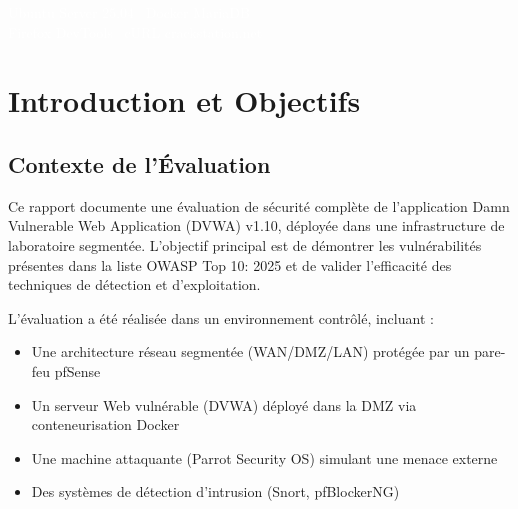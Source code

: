 \documentclass[12pt,a4paper,openany]{report}
\newif\ifshowpagenumbers
\newcommand{\hidepagenumbers}{\showpagenumbersfalse\pagestyle{empty}}
\newcommand{\showpagenumbers}{\showpagenumberstrue\pagestyle{fancy}}
\begin{document}
\begin{titlepage}
		\vfill
		
		\noindent
		\colorbox{primary}{%
			\parbox{\dimexpr\textwidth-2\fboxsep}{%
				\vspace{0.35cm}
				\centering
				{\small\textcolor{white}{%
						Ubuntu Server 25.04 \textbullet\ Docker
						\quad\textbullet\quad MariaDB}}\\[0.2cm]
				{\small\textcolor{white}{%
						Firefox DevTools \textbullet\ cURL
						\quad\textbullet\quad crackstation.net}}\\[0.35cm]
			}%
		}%
		
	\end{titlepage}
	
	\newpage
	\hidepagenumbers
	\tableofcontents
	\newpage
	\listoffigures
	\newpage
	\listoftables
	\cleardoublepage
	\showpagenumbers
	\setcounter{page}{1}
	
	
	\chapter{Introduction et Objectifs}
	
	\section{Contexte de l'Évaluation}
	
	Ce rapport documente une évaluation de sécurité complète de l'application Damn Vulnerable Web Application (DVWA) v1.10, 
	déployée dans une infrastructure de laboratoire segmentée. L'objectif principal est de démontrer les vulnérabilités 
	présentes dans la liste OWASP Top 10: 2025 et de valider l'efficacité des techniques de détection et d'exploitation.
	
	L'évaluation a été réalisée dans un environnement contrôlé, incluant :
	\begin{itemize}
		\item Une architecture réseau segmentée (WAN/DMZ/LAN) protégée par un pare-feu pfSense
		\item Un serveur Web vulnérable (DVWA) déployé dans la DMZ via conteneurisation Docker
		\item Une machine attaquante (Parrot Security OS) simulant une menace externe
		\item Des systèmes de détection d'intrusion (Snort, pfBlockerNG)
	\end{itemize}
	
\end{document}
